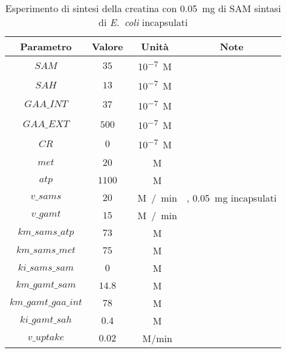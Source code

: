 \begin{table}[H]
	\centering
	\begin{tabular}{| c | c | c | c |}
	\hline
	Parametro & Valore & Unit\`a & Note \\
		\hline
		$SAM$ & $35$ & \si{10^{-7} M} & \\
		\hline
		$SAH$ & $13$ & \si{10^{-7} M} & \\
		\hline
		$GAA\_INT$ & $37$ & \si{10^{-7} M} & \\
		\hline
		$GAA\_EXT$ & $500$ & \si{10^{-7} M} & \\
		\hline
		$CR$ & $0$ & \si{10^{-7} M} & \\
		\hline
		$met$ & $20$ & \si{\mu M} & \\
		\hline
		$atp$ & $1100$ & \si{\mu M} & \\
		\hline
		$v\_sams$ & $20$ & \si{\mu M / min} & \cite{brendasams}, \SI{0.05}{mg} incapsulati \\
		\hline
		$v\_gamt$ & $15$ & \si{\mu M / min} & \\
		\hline
		$km\_sams\_atp$ & $73$ & \si{\mu M} & \cite{brendasams} \\
		\hline
		$km\_sams\_met$ & $75$ & \si{\mu M} & \cite{brendasams} \\
		\hline
		$ki\_sams\_sam$ & $0$ & \si{\mu M} & \cite{brendasams} \\
		\hline
		$km\_gamt\_sam$ & $14.8$ & \si{\mu M} & \\
		\hline
		$km\_gamt\_gaa\_int$ & $78$ & \si{\mu M} & \\
		\hline
		$ki\_gamt\_sah$ & $0.4$ & \si{\mu M} & \\
		\hline
		$v\_uptake$ & $0.02$ & \si{\mu M/min} & \\
		\hline
	\end{tabular}
	\caption{Esperimento di sintesi della creatina con \SI{0.05}{mg} di SAM sintasi di \emph{E.\ coli} incapsulati}
	\label{mod:9}
\end{table}

